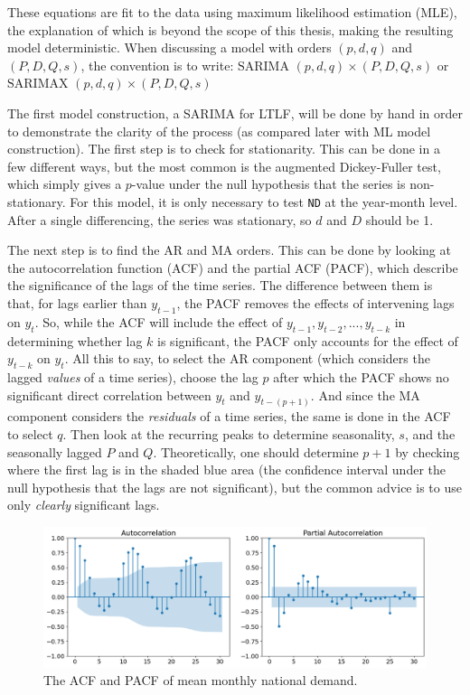 \documentclass[12pt]{scrreprt}
\begin{document}
These equations are fit to the data using maximum likelihood estimation (MLE), the explanation of which is beyond the scope of this thesis, making the resulting model deterministic. When discussing a model with orders $(p,d,q)$ and $(P,D,Q,s)$, the convention is to write: $\textrm{SARIMA } (p,d,q)\times(P,D,Q,s)$ or $\textrm{SARIMAX } (p,d,q)\times(P,D,Q,s)$

The first model construction, a SARIMA for LTLF, will be done by hand in order to demonstrate the clarity of the process (as compared later with ML model construction). The first step is to check for stationarity. This can be done in a few different ways, but the most common is the augmented Dickey-Fuller test, which simply gives a $p$-value under the null hypothesis that the series is non-stationary. For this model, it is only necessary to test \texttt{ND} at the year-month level. After a single differencing, the series was stationary, so $d$ and $D$ should be 1.

The next step is to find the AR and MA orders. This can be done by looking at the autocorrelation function (ACF) and the partial ACF (PACF), which describe the significance of the lags of the time series. The difference between them is that, for lags earlier than $y_{t-1}$, the PACF removes the effects of intervening lags on $y_t$. So, while the ACF will include the effect of $y_{t-1}, y_{t-2}, ..., y_{t-k}$ in determining whether lag $k$ is significant, the PACF only accounts for the effect of $y_{t-k}$ on $y_t$. All this to say, to select the AR component (which considers the lagged \textit{values} of a time series), choose the lag $p$ after which the PACF shows no significant direct correlation between $y_t$ and $y_{t-(p+1)}$. And since the MA component considers the \textit{residuals} of a time series, the same is done in the ACF to select $q$. Then look at the recurring peaks to determine seasonality, $s$, and the seasonally lagged $P$ and $Q$. Theoretically, one should determine $p+1$ by checking where the first lag is in the shaded blue area (the confidence interval under the null hypothesis that the lags are not significant), but the common advice is to use only \textit{clearly} significant lags.

\begin{figure}[h]
    \centering
    \includegraphics[scale=0.5]{Images/ltts_acf.png}
    \caption{The ACF and PACF of mean monthly national demand.}
    \label{fig:ltts_acf}
\end{figure}
\end{document}

